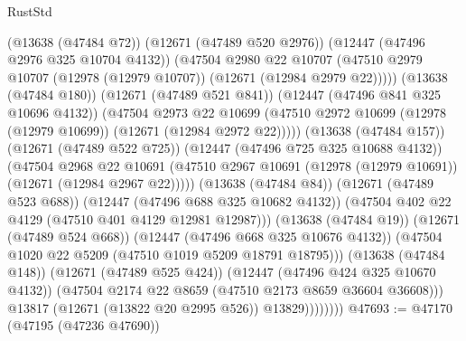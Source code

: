 \begin{lexlean}{RustStd}
\begin{coremodule}
                                (@13638 (@47484 @72))
                                (@12671 (@47489 @520 @2976))
                                (@12447 (@47496 @2976 @325 @10704 @4132))
                                (@47504
                                  @2980
                                  @22
                                  @10707
                                  (@47510
                                    @2979
                                    @10707
                                    (@12978 (@12979 @10707))
                                    (@12671 (@12984 @2979 @22)))))
                              (@13638 (@47484 @180))
                              (@12671 (@47489 @521 @841))
                              (@12447 (@47496 @841 @325 @10696 @4132))
                              (@47504
                                @2973
                                @22
                                @10699
                                (@47510
                                  @2972
                                  @10699
                                  (@12978 (@12979 @10699))
                                  (@12671 (@12984 @2972 @22)))))
                            (@13638 (@47484 @157))
                            (@12671 (@47489 @522 @725))
                            (@12447 (@47496 @725 @325 @10688 @4132))
                            (@47504
                              @2968
                              @22
                              @10691
                              (@47510
                                @2967
                                @10691
                                (@12978 (@12979 @10691))
                                (@12671 (@12984 @2967 @22)))))
                          (@13638 (@47484 @84))
                          (@12671 (@47489 @523 @688))
                          (@12447 (@47496 @688 @325 @10682 @4132))
                          (@47504 @402 @22 @4129 (@47510 @401 @4129 @12981 @12987)))
                        (@13638 (@47484 @19))
                        (@12671 (@47489 @524 @668))
                        (@12447 (@47496 @668 @325 @10676 @4132))
                        (@47504 @1020 @22 @5209 (@47510 @1019 @5209 @18791 @18795)))
                      (@13638 (@47484 @148))
                      (@12671 (@47489 @525 @424))
                      (@12447 (@47496 @424 @325 @10670 @4132))
                      (@47504 @2174 @22 @8659 (@47510 @2173 @8659 @36604 @36608)))
                    @13817
                    (@12671 (@13822 @20 @2995 @526))
                    @13829))))))))
@47693 := @47170 (@47195 (@47236 @47690))

\end{coremodule}
\end{lexlean}
